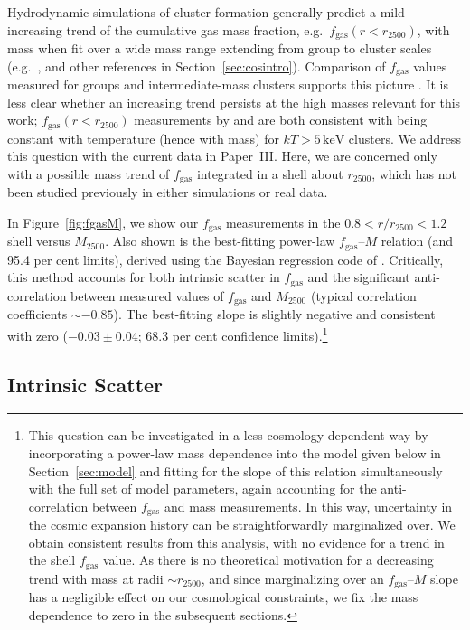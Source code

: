 \documentclass[useAMS,usenatbib,usegraphicx]{mn2e}
\newcommand*{\mysub}[2]{\ensuremath{#1_{\mathrm{#2}}}}
\newcommand*{\unit}[1]{\ensuremath{\mathrm{\, #1}}}
\newcommand*{\fgas}{\mysub{f}{gas}}
\newcommand*{\keV}{\unit{keV}}
\newcommand*{\secref}{Section}
\newcommand*{\figref}{Figure}
\newcommand*{\arsemf}{\citetalias{Allen0706.0033}}
\newcommand*{\profilespaper}{Paper~III}
\begin{document}
Hydrodynamic simulations of cluster formation generally predict a mild increasing trend of the cumulative gas mass fraction, e.g.\ $\fgas(r<r_{2500})$, with mass when fit over a wide mass range extending from group to cluster scales (e.g.\ \citealt{Young1007.0887, Battaglia1209.4082, Planelles1209.5058}, and other references in \secref~\ref{sec:cosintro}). Comparison of \fgas{} values measured for groups and intermediate-mass clusters supports this picture \citep{Sun0805.2320}. It is less clear whether an increasing trend persists at the high masses relevant for this work; $\fgas(r<r_{2500})$ measurements by \citet{Vikhlinin0507092} and \arsemf{} are both consistent with being constant with temperature (hence with mass) for $kT>5\keV$ clusters. We address this question with the current data in \profilespaper{}. Here, we are concerned only with a possible mass trend of \fgas{} integrated in a shell about $r_{2500}$, which has not been studied previously in either simulations or real data.

In \figref~\ref{fig:fgasM}, we show our \fgas{} measurements in the $0.8<r/r_{2500}<1.2$ shell versus $M_{2500}$. Also shown is the best-fitting power-law \fgas--$M$ relation (and 95.4 per cent limits), derived using the Bayesian regression code of \citet{Kelly0705.2774}. Critically, this method accounts for both intrinsic scatter in \fgas{} and the significant anti-correlation between measured values of \fgas{} and $M_{2500}$ (typical correlation coefficients $\sim -0.85$). The best-fitting slope is slightly negative and consistent with zero ($-0.03\pm0.04$; 68.3 per cent confidence limits).\footnote{This question can be investigated in a less cosmology-dependent way by incorporating a power-law mass dependence into the model given below in \secref~\ref{sec:model} and fitting for the slope of this relation simultaneously with the full set of model parameters, again accounting for the anti-correlation between \fgas{} and mass measurements. In this way, uncertainty in the cosmic expansion history can be straightforwardly marginalized over. We obtain consistent results from this analysis, with no evidence for a trend in the shell \fgas{} value. As there is no theoretical motivation for a decreasing trend with mass at radii $\sim r_{2500}$, and since marginalizing over an \fgas--$M$ slope has a negligible effect on our cosmological constraints, we fix the mass dependence to zero in the subsequent sections.}




\subsection{Intrinsic Scatter} \label{sec:scatter}
\end{document}
